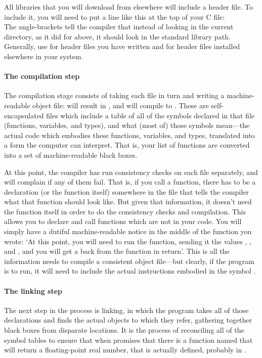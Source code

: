 \documentclass[12pt]{article}
\def\ind#1{\index{#1}#1}
\begin{document}
All libraries that you will download from elsewhere will include a header file.
To include it, you will need to put a line like this at the top of your C file:
\\
The angle-brackets tell the compiler that instead of looking in the
current directory, as it did for  above, it should
look in the standard library path. Generally, use  for
header files you have written and  for header files installed elsewhere
in your system.  

\paragraph{The compilation step} 
The \ind{compilation}
stage consists of taking each  file in turn and
writing a machine-readable object file:  will
result in , and  will compile to
. These  are self-encapsulated
files which include a table of all of the symbols declared in that file
(functions, variables, and types), and what (most of) those symbols
mean---the actual code which embodies these functions, variables, and
types, translated into a form the computer can interpret. That is, your
list of functions are converted into a set of machine-readable black
boxes.

At this point, the compiler has run consistency checks on each file separately,
and will complain if any of them fail. That is, if you call a function,
there has to be a declaration (or the function itself) somewhere in the
file that tells the compiler what that function should look like. But 
given that information, it doesn't need the function itself in order to
do the consistency checks and compilation. This allows you to declare
and call functions which are not in your code. You will simply have a
dutiful machine-readable notice in the middle of the function you wrote:
`At this point, you will need to run the  function,
sending it the values , , and , and
you will get a  back from the function in return'. This is
all the information  needs to compile a consistent object file---but
clearly, if the program is to run, it will need to include the actual
instructions embodied in the symbol .

\paragraph{The \ind{linking} step}
The next step in the process is linking, in which the program takes all
of those declarations and finds the actual objects to which they
refer, gathering together black boxes from disparate locations. It
is the process of reconciling all of the symbol tables to ensure
that when  promises that there is a function named
 that will return a floating-point real
number, that  is actually defined,  probably
in .
\end{document}
